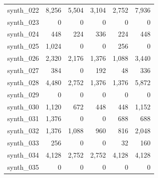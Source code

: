 \begin{longtable}{lrrrrr}
synth\_022 & 8,256 & 5,504 & 3,104 & 2,752 & 7,936 \\
synth\_023 & 0 & 0 & 0 & 0 & 0 \\
synth\_024 & 448 & 224 & 336 & 224 & 448 \\
synth\_025 & 1,024 & 0 & 0 & 256 & 0 \\
synth\_026 & 2,320 & 2,176 & 1,376 & 1,088 & 3,440 \\
synth\_027 & 384 & 0 & 192 & 48 & 336 \\
synth\_028 & 4,480 & 2,752 & 1,376 & 1,376 & 5,872 \\
synth\_029 & 0 & 0 & 0 & 0 & 0 \\
synth\_030 & 1,120 & 672 & 448 & 448 & 1,152 \\
synth\_031 & 1,376 & 0 & 0 & 688 & 688 \\
synth\_032 & 1,376 & 1,088 & 960 & 816 & 2,048 \\
synth\_033 & 256 & 0 & 0 & 32 & 160 \\
synth\_034 & 4,128 & 2,752 & 2,752 & 4,128 & 4,128 \\
synth\_035 & 0 & 0 & 0 & 0 & 0 \\
\end{longtable}
\endgroup
